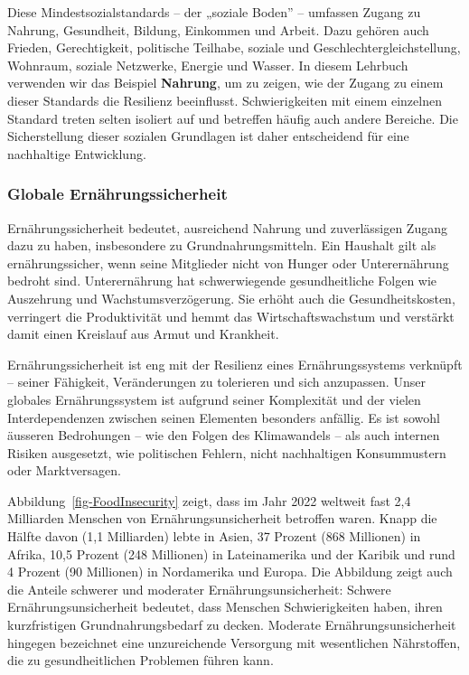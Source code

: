 \documentclass[
  nswissgerman,
  a4paper,
  DIV=11,
  numbers=noendperiod,
  oneside,
  openany]{scrreprt}
\begin{document}
Diese Mindestsozialstandards -- der „soziale Boden'' -- umfassen Zugang
zu Nahrung, Gesundheit, Bildung, Einkommen und Arbeit. Dazu gehören auch
Frieden, Gerechtigkeit, politische Teilhabe, soziale und
Geschlechtergleichstellung, Wohnraum, soziale Netzwerke, Energie und
Wasser. In diesem Lehrbuch verwenden wir das Beispiel \textbf{Nahrung},
um zu zeigen, wie der Zugang zu einem dieser Standards die Resilienz
beeinflusst. Schwierigkeiten mit einem einzelnen Standard treten selten
isoliert auf und betreffen häufig auch andere Bereiche. Die
Sicherstellung dieser sozialen Grundlagen ist daher entscheidend für
eine nachhaltige Entwicklung.

\subsubsection{Globale
Ernährungssicherheit}\label{globale-ernuxe4hrungssicherheit}

Ernährungssicherheit bedeutet, ausreichend Nahrung und zuverlässigen
Zugang dazu zu haben, insbesondere zu Grundnahrungsmitteln. Ein Haushalt
gilt als ernährungssicher, wenn seine Mitglieder nicht von Hunger oder
Unterernährung bedroht sind. Unterernährung hat schwerwiegende
gesundheitliche Folgen wie Auszehrung und Wachstumsverzögerung. Sie
erhöht auch die Gesundheitskosten, verringert die Produktivität und
hemmt das Wirtschaftswachstum und verstärkt damit einen Kreislauf aus
Armut und Krankheit.

Ernährungssicherheit ist eng mit der Resilienz eines Ernährungssystems
verknüpft -- seiner Fähigkeit, Veränderungen zu tolerieren und sich
anzupassen. Unser globales Ernährungssystem ist aufgrund seiner
Komplexität und der vielen Interdependenzen zwischen seinen Elementen
besonders anfällig. Es ist sowohl äusseren Bedrohungen -- wie den Folgen
des Klimawandels -- als auch internen Risiken ausgesetzt, wie
politischen Fehlern, nicht nachhaltigen Konsummustern oder
Marktversagen.

Abbildung~\ref{fig-FoodInsecurity} zeigt, dass im Jahr 2022 weltweit
fast 2,4 Milliarden Menschen von Ernährungsunsicherheit betroffen waren.
Knapp die Hälfte davon (1,1 Milliarden) lebte in Asien, 37 Prozent (868
Millionen) in Afrika, 10,5 Prozent (248 Millionen) in Lateinamerika und
der Karibik und rund 4 Prozent (90 Millionen) in Nordamerika und Europa.
Die Abbildung zeigt auch die Anteile schwerer und moderater
Ernährungsunsicherheit: Schwere Ernährungsunsicherheit bedeutet, dass
Menschen Schwierigkeiten haben, ihren kurzfristigen Grundnahrungsbedarf
zu decken. Moderate Ernährungsunsicherheit hingegen bezeichnet eine
unzureichende Versorgung mit wesentlichen Nährstoffen, die zu
gesundheitlichen Problemen führen kann.
\end{document}

